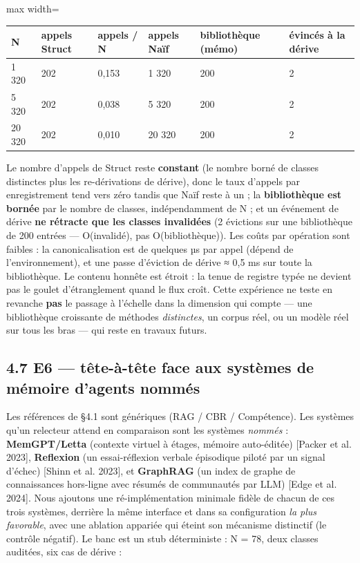 \documentclass[11pt]{article}
\begin{document}
\begin{center}\small\begin{adjustbox}{max width=\linewidth}\begin{tabular}{llllll}\toprule
N & appels Struct & appels / N & appels Naïf & bibliothèque (mémo) & évincés à la dérive \\ \midrule
1 320 & 202 & 0,153 & 1 320 & 200 & 2 \\
5 320 & 202 & 0,038 & 5 320 & 200 & 2 \\
20 320 & 202 & 0,010 & 20 320 & 200 & 2 \\
\bottomrule\end{tabular}\end{adjustbox}\end{center}

Le nombre d'appels de Struct reste \textbf{constant} (le nombre borné de classes distinctes plus les re-dérivations de dérive), donc le taux d'appels par enregistrement tend vers zéro tandis que Naïf reste à un ; la \textbf{bibliothèque est bornée} par le nombre de classes, indépendamment de N ; et un événement de dérive \textbf{ne rétracte que les classes invalidées} (2 évictions sur une bibliothèque de 200 entrées — O(invalidé), pas O(bibliothèque)). Les coûts par opération sont faibles : la canonicalisation est de quelques µs par appel (dépend de l'environnement), et une passe d'éviction de dérive ≈ 0,5 ms sur toute la bibliothèque. Le contenu honnête est étroit : la tenue de registre typée ne devient pas le goulet d'étranglement quand le flux croît. Cette expérience ne teste en revanche \textbf{pas} le passage à l'échelle dans la dimension qui compte — une bibliothèque croissante de méthodes \emph{distinctes}, un corpus réel, ou un modèle réel sur tous les bras — qui reste en travaux futurs.

\subsection*{4.7 E6 — tête-à-tête face aux systèmes de mémoire d'agents nommés}

Les références de §4.1 sont génériques (RAG / CBR / Compétence). Les systèmes qu'un relecteur attend en comparaison sont les systèmes \emph{nommés} : \textbf{MemGPT/Letta} (contexte virtuel à étages, mémoire auto-éditée) [Packer et al. 2023], \textbf{Reflexion} (un essai-réflexion verbale épisodique piloté par un signal d'échec) [Shinn et al. 2023], et \textbf{GraphRAG} (un index de graphe de connaissances hors-ligne avec résumés de communautés par LLM) [Edge et al. 2024]. Nous ajoutons une ré-implémentation minimale fidèle de chacun de ces trois systèmes, derrière la même interface et dans sa configuration \emph{la plus favorable}, avec une ablation appariée qui éteint son mécanisme distinctif (le contrôle négatif). Le banc est un stub déterministe : N = 78, deux classes auditées, six cas de dérive :
\end{document}
